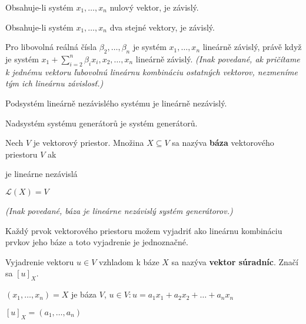 \pagebreak[3]
\begin{veta}
\begin{penumerate}
\item Obsahuje-li systém $x_1, \dots, x_n$ nulový vektor, je závislý.
\item Obsahuje-li systém $x_1, \dots, x_n$ dva stejné vektory, je závislý.
\item Pro libovolná reálná čísla $\beta_2, \dots, \beta_n$ je systém $x_1, \dots, x_n$ lineárně závislý, právě když je systém $x_1+\sum_{i=2}^n \beta_i x_i, x_2, \dots, x_n$ lineárně závislý. \textit{(Inak povedané, ak pričítame k jednému vektoru ľubovolnú lineárnu kombináciu ostatných vektorov, nezmeníme tým ich lineárnu závislosť.)}
\end{penumerate}
\end{veta}

\begin{veta}
\begin{penumerate}
	\item Podsystém lineárně nezávislého systému je lineárně nezávislý.
	\item Nadsystém systému generátorů je systém generátorů.
\end{penumerate}
\end{veta}

\begin{definicia}
Nech $V$ je vektorový priestor. Množina $X \subseteq V$ sa nazýva \textbf{báza} vektorového priestoru $V$ ak
\begin{pitemize}
	\item je lineárne nezávislá
	\item $\mathcal{L}(X) = V$
\end{pitemize}
\textit{(Inak povedané, báza je lineárne nezávislý systém generátorov.)}
\end{definicia}

\begin{vetaSK}
Každý prvok vektorového priestoru možem vyjadriť ako lineárnu kombináciu prvkov jeho báze a toto vyjadrenie je jednoznačné.
\end{vetaSK}

\begin{definicia}
Vyjadrenie vektoru $u \in V$ vzhladom k báze $X$ sa nazýva \textbf{vektor súradníc}. Značí sa $[u]_{X}$.

$(x_{1}, \dots , x_{n}) = X$ je báza $V$, $u \in V: u = a_{1}x_{1} + a_{2}x_{2} + \dots +a_{n}x_{n}$

$[u]_{X} = (a_{1}, \dots , a_{n})$
\end{definicia}


